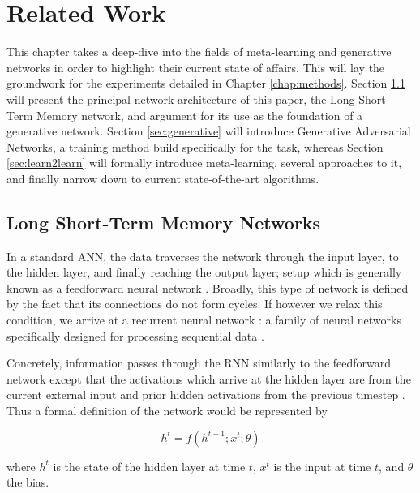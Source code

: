 \documentclass[a4paper]{book}
\begin{document}
\chapter{Related Work}\label{chap:theoretical_framework}

This chapter takes a deep-dive into the fields of meta-learning and generative networks in order to highlight their current state of affairs. This will lay the groundwork for the experiments detailed in Chapter \ref{chap:methods}. Section \ref{sec:lstm} will present the principal network architecture of this paper, the Long Short-Term Memory network, and argument for its use as the foundation of a generative network. Section \ref{sec:generative} will introduce Generative Adversarial Networks, a training method build specifically for the task, whereas Section \ref{sec:learn2learn} will formally introduce meta-learning, several approaches to it, and finally narrow down to current state-of-the-art algorithms. 

\section{Long Short-Term Memory Networks} \label{sec:lstm}

In a standard ANN, the data traverses the network through the input layer, to the hidden layer, and finally reaching the output layer; setup which is generally known as a feedforward neural network \parencite[Figure \ref{fig:feedforward_net};][]{graves_supervised_2012}. Broadly, this type of network is defined by the fact that its connections do not form cycles. If however we relax this condition, we arrive at a recurrent neural network \parencite[Figure \ref{fig:rnn_folded};][]{rumelhart_learning_1986}: a family of neural networks specifically designed for processing sequential data \parencite{goodfellow_deep_2016}.

Concretely, information passes through the RNN similarly to the feedforward network except that the activations which arrive at the hidden layer are from the current external input and prior hidden activations from the previous timestep \parencite{graves_supervised_2012}. Thus a formal definition of the network would be represented by

\begin{equation}
    h^t = f(h^{t-1}; x^t; \theta)
\end{equation}

where $h^t$ is the state of the hidden layer at time $t$, $x^t$ is the input at time $t$, and $\theta$ the bias.
\end{document}
